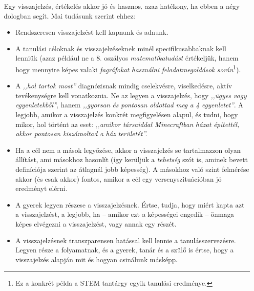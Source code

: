 Egy visszajelzés, értékelés akkor jó és hasznos, azaz hatékony, ha ebben a négy
dologban segít. Mai tudásunk szerint ehhez:
\begin{itemize}
      \item Rendszeresen visszajelzést kell kapnunk és adnunk.
      \item A tanulási céloknak és visszajelzéseknek minél specifikusabbaknak
            kell
            lenniük (azaz például ne a 8. oszályos \emph{matematikatudást}
            értékeljük,
            hanem hogy mennyire képes valaki \emph{fagráfokat
                  használni
                  feladatmegoldások során}\footnote{Ez a konkrét példa a STEM
                  tantárgy
                  egyik
                  tanulási eredménye.}).
      \item A \emph{,,hol tartok most''} diagnózisnak mindig cselekvésre,
            viselkedésre, aktív tevékenységre kell vonatkoznia. Ne az legyen a
            visszajelzés, hogy \emph{,,ügyes vagy egyenletekből''}, hanem
            \emph{,,gyorsan és
                  pontosan oldottad meg a 4 egyenletet''}. A legjobb, amikor a
            visszajelzés
            konkrét megfigyelésen alapul, és tudni, hogy mikor, hol történt az
            eset:
            \emph{,,amikor társaiddal Minecraftban házat építettél, akkor
                  pontosan
                  kiszámoltad a ház területét''.}
      \item Ha a cél nem a mások legyőzése, akkor a visszajelzés se
            tartalmazzon
            olyan állítást, ami másokhoz hasonlít (így kerüljük a
            \emph{tehetség}
            szót is,
            aminek bevett definíciója szerint az átlagnál jobb képesség). A
            másokhoz való
            szint felmérése akkor (és csak akkor) fontos, amikor a cél egy
            versenyszituációban jó eredményt elérni.

      \item A gyerek legyen részese a visszajelzésnek. Értse, tudja, hogy miért
            kapta
            azt a visszajelzést, a legjobb, ha -- amikor ezt a képességei
            engedik
            -- önmaga
            képes elvégezni a visszajelzést, vagy annak egy részét.
      \item A visszajelzésnek transzparensen hatással kell lennie a
            tanulásszervezésre. Legyen része a folyamatnak, és a gyerek, tanár
            és a
            szülő
            is értse, hogy a visszajelzés alapján mit és hogyan csinálunk
            másképp.
\end{itemize}

